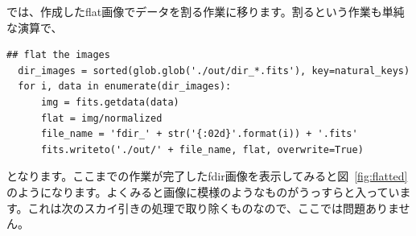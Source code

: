 では、作成したflat画像でデータを割る作業に移ります。割るという作業も単純な演算で、
\begin{lstlisting}[caption=フラット割り,label=code:flatting]
  ## flat the images
  dir_images = sorted(glob.glob('./out/dir_*.fits'), key=natural_keys)
  for i, data in enumerate(dir_images):
      img = fits.getdata(data)
      flat = img/normalized
      file_name = 'fdir_' + str('{:02d}'.format(i)) + '.fits'
      fits.writeto('./out/' + file_name, flat, overwrite=True)
\end{lstlisting}
となります。ここまでの作業が完了したfdir画像を表示してみると図~\ref{fig:flatted}のようになります。よくみると画像に模様のようなものがうっすらと入っています。これは次のスカイ引きの処理で取り除くものなので、ここでは問題ありません。
\begin{figure}
	\centering
\end{figure}
